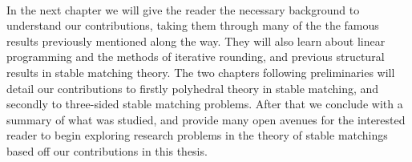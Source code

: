 \paragraph{}
In the next chapter we will give the reader the necessary background to understand our contributions, taking them through many of the the famous results previously mentioned along the way. They will also learn about linear programming and the methods of iterative rounding, and previous structural results in stable matching theory. The two chapters following preliminaries will detail our contributions to firstly polyhedral theory in stable matching, and secondly to three-sided stable matching problems. After that we conclude with a summary of what was studied, and provide many open avenues for the interested reader to begin exploring research problems in the theory of stable matchings based off our contributions in this thesis.
